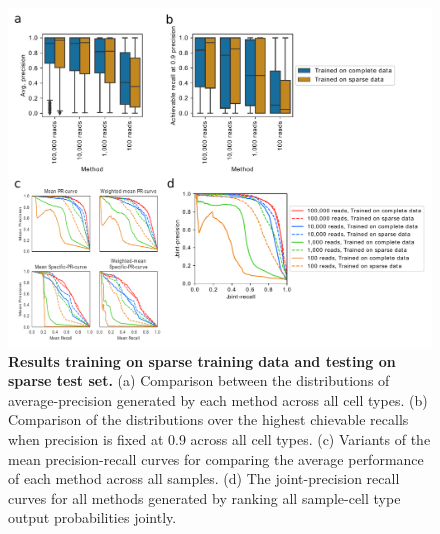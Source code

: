 
 \begin{figure}[h!]
      \centerline{\includegraphics[width=13cm]{figures/bulk_train_and_test_downsampled_results.pdf}}
      \caption{\textbf{Results training on sparse training data and testing on sparse test set.} (a) Comparison between the distributions of average-precision generated by each method across all cell types.  (b) Comparison of the distributions over the highest chievable recalls when precision is fixed at 0.9 across all cell types. (c) Variants of the mean precision-recall curves for comparing the average performance of each method across all samples. (d) The joint-precision recall curves for all methods generated by ranking all sample-cell type output probabilities jointly.}
      \label{fig:results_train_and_test_bulk_downsample}
      \end{figure}

